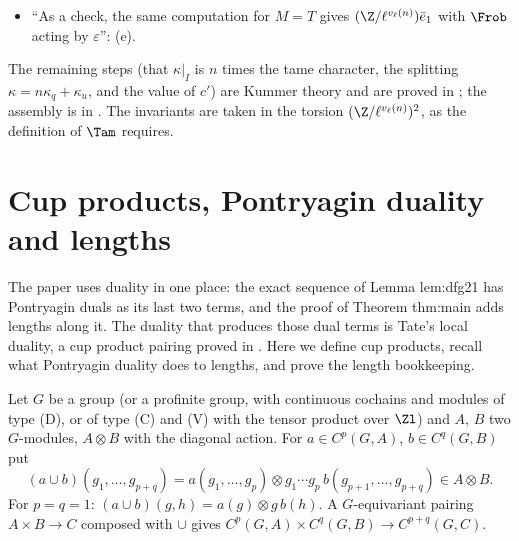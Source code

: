 \begin{paperlink}
\begin{itemize}
multiple of $q-1$)'': (d).
\item ``As a check, the same computation for $M=T$ gives $(\Z/\ell^{v_\ell(n)})\bar e_1$ with $\Frob$ acting by $\varepsilon$'': (e).
\end{itemize}
The remaining steps (that $\kappa|_I$ is $n$ times the tame character, the splitting $\kappa=n\kappa_q+\kappa_u$, and the value of $c'$) are Kummer theory and are proved in
; the assembly is in . The invariants are taken in the torsion $(\Z/\ell^{v_\ell(n)})^2$, as the definition of $\Tam$ requires.
\end{paperlink}

\section{Cup products, Pontryagin duality and lengths}\label{sec:cohomology:cup}

The paper uses duality in one place: the exact sequence of Lemma lem:dfg21 has Pontryagin duals as its last two terms, and the proof of Theorem thm:main
adds lengths along it. The duality that produces those dual terms is Tate's local duality, a cup product pairing proved in . Here we define
cup products, recall what Pontryagin duality does to lengths, and prove the length bookkeeping.

\begin{definition}\label{def:cohomology:cup}
Let $G$ be a group (or a profinite group, with continuous cochains and modules of type (D), or of type (C) and (V) with the tensor product over $\Zl$) and $A$, $B$
two $G$-modules, $A\otimes B$ with the diagonal action. For $a\in C^p(G,A)$, $b\in C^q(G,B)$ put
\[
(a\cup b)(g_1,\dots,g_{p+q})=a(g_1,\dots,g_p)\otimes g_1\cdots g_p\,b(g_{p+1},\dots,g_{p+q})\in A\otimes B .
\]
For $p=q=1$: $(a\cup b)(g,h)=a(g)\otimes g\,b(h)$. A $G$-equivariant pairing $A\times B\to C$ composed with $\cup$ gives $C^p(G,A)\times C^q(G,B)\to C^{p+q}(G,C)$.
\end{definition}

